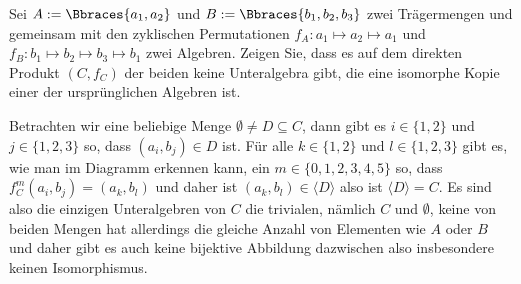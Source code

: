 \begin{exercise}
    Sei $A := \Bbraces{a_1, a_2}$ und $B := \Bbraces{b_1, b_2, b_3}$ zwei Trägermengen und gemeinsam mit den zyklischen Permutationen $f_A: a_1 \mapsto a_2 \mapsto a_1$ und $f_B: b_1 \mapsto b_2 \mapsto b_3 \mapsto b_1$ zwei Algebren. Zeigen Sie, dass es auf dem direkten Produkt $(C, f_C)$ der beiden keine Unteralgebra gibt, die eine isomorphe Kopie einer der ursprünglichen Algebren ist.
\end{exercise}

\begin{solution}
    Betrachten wir eine beliebige Menge $\emptyset \neq D \subseteq C$, dann gibt es $i \in \{1, 2\} $ und $j \in \{1, 2, 3\}$ so, dass $(a_i, b_j) \in D$ ist. Für alle $k \in \{1, 2\}$ und $l \in \{1, 2, 3\}$ gibt es, wie man im Diagramm erkennen kann, ein $m \in \{0, 1, 2, 3, 4, 5\}$ so, dass $f_C^m(a_i, b_j) = (a_k, b_l)$ und daher ist $(a_k, b_l) \in \langle D \rangle$ also ist $\langle D \rangle = C$. Es sind also die einzigen Unteralgebren von $C$ die trivialen, nämlich $C$ und $\emptyset$, keine von beiden Mengen hat allerdings die gleiche Anzahl von Elementen wie $A$ oder $B$ und daher gibt es auch keine bijektive Abbildung dazwischen also insbesondere keinen Isomorphismus.
\end{solution}
